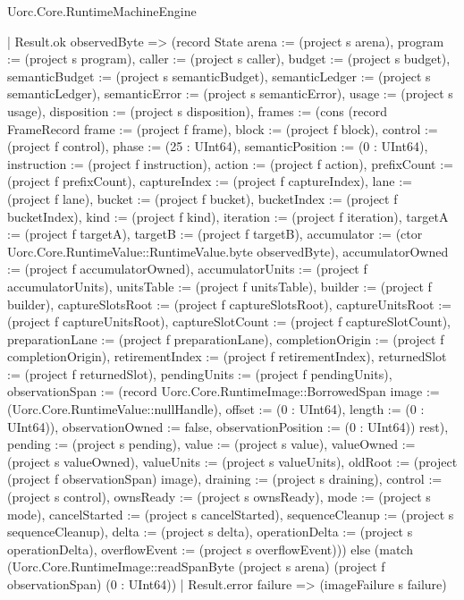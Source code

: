 \begin{lexlean}{Uorc.Core.RuntimeMachineEngine}
\begin{semanticmodule}
{        | Result.ok observedByte => (record State {arena := (project s arena), program := (project s program), caller := (project s caller), budget := (project s budget), semanticBudget := (project s semanticBudget), semanticLedger := (project s semanticLedger), semanticError := (project s semanticError), usage := (project s usage), disposition := (project s disposition), frames := (cons (record FrameRecord {frame := (project f frame), block := (project f block), control := (project f control), phase := (25 : UInt64), semanticPosition := (0 : UInt64), instruction := (project f instruction), action := (project f action), prefixCount := (project f prefixCount), captureIndex := (project f captureIndex), lane := (project f lane), bucket := (project f bucket), bucketIndex := (project f bucketIndex), kind := (project f kind), iteration := (project f iteration), targetA := (project f targetA), targetB := (project f targetB), accumulator := (ctor Uorc.Core.RuntimeValue::RuntimeValue.byte observedByte), accumulatorOwned := (project f accumulatorOwned), accumulatorUnits := (project f accumulatorUnits), unitsTable := (project f unitsTable), builder := (project f builder), captureSlotsRoot := (project f captureSlotsRoot), captureUnitsRoot := (project f captureUnitsRoot), captureSlotCount := (project f captureSlotCount), preparationLane := (project f preparationLane), completionOrigin := (project f completionOrigin), retirementIndex := (project f retirementIndex), returnedSlot := (project f returnedSlot), pendingUnits := (project f pendingUnits), observationSpan := (record Uorc.Core.RuntimeImage::BorrowedSpan {image := (Uorc.Core.RuntimeValue::nullHandle), offset := (0 : UInt64), length := (0 : UInt64)}), observationOwned := false, observationPosition := (0 : UInt64)}) rest), pending := (project s pending), value := (project s value), valueOwned := (project s valueOwned), valueUnits := (project s valueUnits), oldRoot := (project (project f observationSpan) image), draining := (project s draining), control := (project s control), ownsReady := (project s ownsReady), mode := (project s mode), cancelStarted := (project s cancelStarted), sequenceCleanup := (project s sequenceCleanup), delta := (project s delta), operationDelta := (project s operationDelta), overflowEvent := (project s overflowEvent)})) else (match (Uorc.Core.RuntimeImage::readSpanByte (project s arena) (project f observationSpan) (0 : UInt64))
        | Result.error failure => (imageFailure s failure)
}
\end{semanticmodule}
\end{lexlean}
